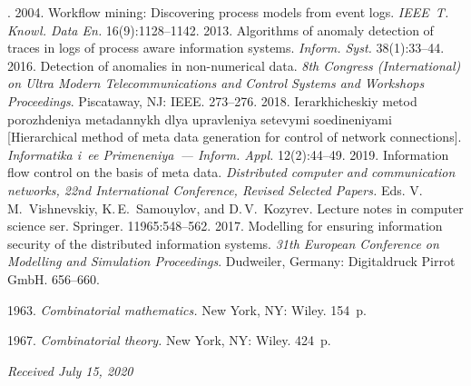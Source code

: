 \begin{multicols}{2}
{{\begin{thebibliography}{99}
. 2004. Workflow mining: Discovering process models 
from event logs. \textit{IEEE~T. Knowl. Data En.} 16(9):1128--1142.
 2013. Algorithms of anomaly detection of traces in logs of process 
aware information systems. \textit{Inform. Syst.} 38(1):33--44.
 2016. Detection of anomalies in non-numerical data. 
\textit{8th Congress (International) on Ultra Modern Telecommunications and Control Systems and 
Workshops Proceedings}. Piscataway, NJ: IEEE. 273--276.
 2018. Ierarkhicheskiy metod 
porozhdeniya metadannykh dlya upravleniya setevymi soedineniyami [Hierarchical method of meta 
data generation for control of network connections]. \textit{Informatika i~ee Primeneniya~--- Inform. 
Appl.} 12(2):44--49.
 2019. Information flow control on the 
basis of meta data. \textit{Distributed computer and communication networks, 22nd International 
Conference, Revised Selected Papers.} Eds. V.\,M.~Vishnevskiy, K.\,E.~Samouylov, and 
D.\,V.~Kozyrev. Lecture notes in computer science ser. Springer. 11965:548--562.
 2017. Modelling for ensuring 
information security of the distributed information systems. \textit{31th European Conference on 
Modelling and Simulation Proceedings}. Dudweiler, Germany: Digitaldruck Pirrot GmbH. 656--660. 

 1963. \textit{Combinatorial mathematics.} New York, NY: Wiley. 154~p.

 1967. \textit{Combinatorial theory.} New York, NY: Wiley. 424~p.

\end{thebibliography}

 }
 }

\end{multicols}

\vspace*{-6pt}

\hfill{\small\textit{Received July 15, 2020}}



\Contr

